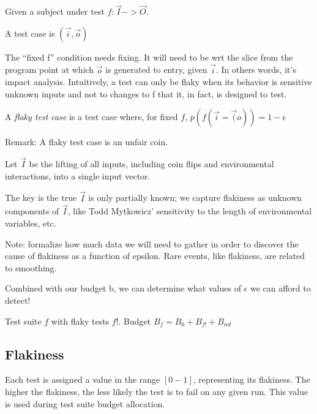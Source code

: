 \begin{defn}
	Given a subject under test $f: \vec{I} -> \vec{O}$.

	A test case is $(\vec{i},\vec{o})$

	The “fixed f” condition needs fixing. It will need to be wrt the slice from the program point at which $\vec{o}$ is generated to entry, given $\vec{i}$. In others words, it’s impact analysis. Intuitively, a test can only be flaky when its behavior is sensitive unknown inputs and not to changes to f that it, in fact, is designed to test.

	A \emph{flaky test case} is a test case where, for fixed $f$,
	$p(f(\vec{i} = \vec(o)) = 1 - \epsilon$

	Remark: A flaky test case is an unfair coin.

	Let $\vec{I}$ be the lifting of all inputs, including coin flips and environmental interactions, into a single input vector.

	The key is the true $\vec{I}$ is only partially known;  we capture flakiness as unknown components of $\vec{I}$, like Todd Mytkowicz’ sensitivity to the length of environmental variables, etc.

	Note: formalize how much data we will need to gather in order to discover the cause of flakiness as a function of epsilon. Rare events, like flakiness, are related to smoothing.

	Combined with our budget b, we can determine what values of $\epsilon$ we can afford to detect!
\end{defn}

Test suite $f$ with flaky tests $f!$.
Budget $B_{f} = B_{6} + B_{f!} + B_{nd}$

\subsection{Flakiness}

Each test is assigned a value in the range $[0-1]$, representing its flakiness. The higher the flakiness, the less likely the test is to fail on any given run. This value is used during test suite budget allocation.

